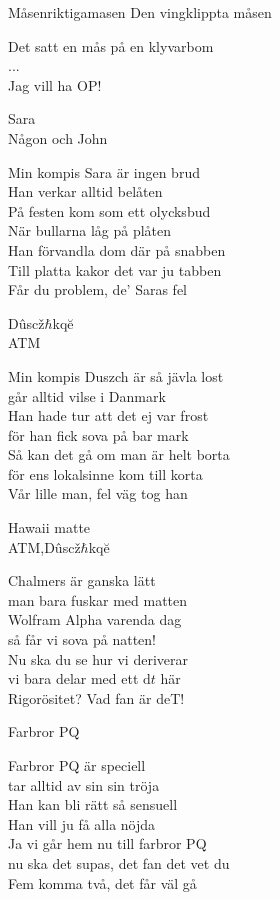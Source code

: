\begin{song}{Måsen}{riktigamasen}
  {\Large Den vingklippta måsen}
  \begin{vers}
Det satt en mås på en klyvarbom \\
... \\
Jag vill ha OP! \\
\end{vers}
 

  {\Large Sara}\\{\tiny  Någon och John}
  \begin{vers}
Min kompis Sara är ingen brud\\
Han verkar alltid belåten\\
På festen kom som ett olycksbud\\
När bullarna låg på plåten\\
Han förvandla dom där på snabben\\
Till platta kakor det var ju tabben\\
Får du problem, de' Saras fel\\
\end{vers}

{\Large Dûscž$\hbar$kqĕ}\\{\tiny  ATM}
\begin{vers}
Min kompis Duszch är så jävla lost\\
går alltid vilse i Danmark\\
Han hade tur att det ej var frost\\
för han fick sova på bar mark\\
Så kan det gå om man är helt borta\\
för ens lokalsinne kom till korta\\
Vår lille man, fel väg tog han\\
\end{vers}

{\Large Hawaii matte}\\{\tiny  ATM,Dûscž$\hbar$kqĕ}
\begin{vers}

Chalmers är ganska lätt\\
man bara fuskar med matten\\
Wolfram Alpha varenda dag\\
så får vi sova på natten! \\
Nu ska du se hur vi deriverar\\
vi bara delar med ett $\mathrm{d}t$ här\\
Rigorösitet? Vad fan är deT! \\
\end{vers}

{\Large Farbror PQ}
\begin{vers}
Farbror PQ är speciell\\
tar alltid av sin sin tröja\\
Han kan bli rätt så sensuell\\
Han vill ju få alla nöjda\\
Ja vi går hem nu till farbror PQ\\
nu ska det supas, det fan det vet du\\
Fem komma två, det får väl gå
\end{vers}

\end{song}
